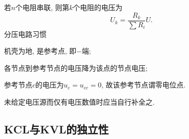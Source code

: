 \documentclass{ctexart}
\begin{document}
若$n$个电阻串联, 则第$k$个电阻的电压为
\[ U_k = \frac{R_k}{\sum R_i} U. \]
分压电路习惯
\begin{cenum}
    \item 机壳为地, 是参考点, 即$-$端;
    \item 各节点到参考节点的电压降为该点的节点电压;
    \item 参考节点$c$的电压为$u_c=u_{cc} = 0$, 故该参考节点谓零电位点.
\end{cenum}
\begin{remark}
    未给定电压源而仅有电压数值时应当自行补全之.
\end{remark}



\subsection{KCL与KVL的独立性} %
\label{sub:kcl与kvl的独立性}
\end{document}
